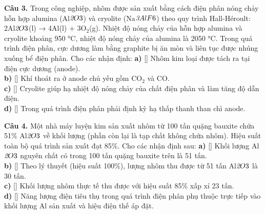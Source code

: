 \documentclass{article}
\begin{document}
\fontsize{22}{29}\selectfont
\textbf{Câu 3.} Trong công nghiệp, nhôm được sản xuất bằng cách điện phân nóng chảy hỗn hợp alumina (Al$\textit{{\text{2}}$O$}{\text{3}}$) và cryolite (Na$\textit{{\text{3}}$AlF$}{\text{6}}$) theo quy trình Hall-Héroult: 2Al$\textit{{\text{2}}$O$}{\text{3}}$(l) → 4Al(l) + 3O$_{\text{2}}$(g). Nhiệt độ nóng chảy của hỗn hợp alumina và cryolite khoảng 950 °C, nhiệt độ nóng chảy của alumina là 2050 °C. Trong quá trình điện phân, cực dương làm bằng graphite bị ăn mòn và liên tục được nhúng xuống bể điện phân. Cho các nhận định:
\vspace{6pt}
\textbf{a)} [\quad] Nhôm kim loại được tách ra tại điện cực dương (anode).\\[4pt]
\textbf{b)} [\quad] Khí thoát ra ở anode chủ yếu gồm CO$_{\text{2}}$ và CO.\\[4pt]
\textbf{c)} [\quad] Cryolite giúp hạ nhiệt độ nóng chảy của chất điện phân và làm tăng độ dẫn điện.\\[4pt]
\textbf{d)} [\quad] Trong quá trình điện phân phải định kỳ hạ thấp thanh than chì anode.\\[4pt]
\vspace*{\fill}
\newpage

\fontsize{22}{29}\selectfont
\textbf{Câu 4.} Một nhà máy luyện kim sản xuất nhôm từ 100 tấn quặng bauxite chứa 51\% Al$\textit{{\text{2}}$O$}{\text{3}}$ về khối lượng (phần còn lại là tạp chất không chứa nhôm). Hiệu suất toàn bộ quá trình sản xuất đạt 85\%. Cho các nhận định sau:
\vspace{6pt}
\textbf{a)} [\quad] Khối lượng Al$\textit{{\text{2}}$O$}{\text{3}}$ nguyên chất có trong 100 tấn quặng bauxite trên là 51 tấn.\\[4pt]
\textbf{b)} [\quad] Theo lý thuyết (hiệu suất 100\%), lượng nhôm thu được từ 51 tấn Al$\textit{{\text{2}}$O$}{\text{3}}$ là 30 tấn.\\[4pt]
\textbf{c)} [\quad] Khối lượng nhôm thực tế thu được với hiệu suất 85\% xấp xỉ 23 tấn.\\[4pt]
\textbf{d)} [\quad] Năng lượng điện tiêu thụ trong quá trình điện phân phụ thuộc trực tiếp vào khối lượng Al sản xuất và hiệu điện thế áp đặt.\\[4pt]
\vspace*{\fill}
\newpage
\end{document}
